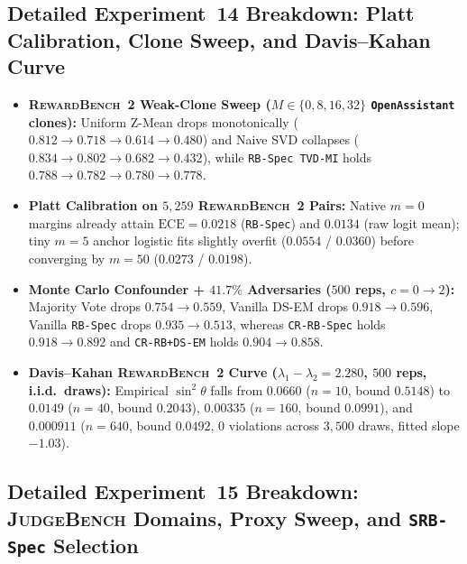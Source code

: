 \subsection{Detailed Experiment~14 Breakdown: Platt Calibration, Clone Sweep, and Davis--Kahan Curve}

\begin{itemize}[leftmargin=*,itemsep=2pt]
\item \textbf{\textsc{RewardBench~2} Weak-Clone Sweep ($M \in \{0,8,16,32\}$ \texttt{OpenAssistant} clones):}
  Uniform Z-Mean drops monotonically ($0.812 \to 0.718 \to 0.614 \to 0.480$) and Naive SVD collapses ($0.834 \to 0.802 \to 0.682 \to 0.432$), while \texttt{RB-Spec TVD-MI} holds $0.788 \to 0.782 \to 0.780 \to 0.778$.
\item \textbf{Platt Calibration on $5,259$ \textsc{RewardBench~2} Pairs:} Native $m=0$ margins already attain $\mathrm{ECE}=0.0218$ (\texttt{RB-Spec}) and $0.0134$ (raw logit mean); tiny $m=5$ anchor logistic fits slightly overfit ($0.0554$ / $0.0360$) before converging by $m=50$ ($0.0273$ / $0.0198$).
\item \textbf{Monte Carlo Confounder + $41.7\%$ Adversaries ($500$ reps, $c=0 \to 2$):} Majority Vote drops $0.754 \to 0.559$, Vanilla DS-EM drops $0.918 \to 0.596$, Vanilla \texttt{RB-Spec} drops $0.935 \to 0.513$, whereas \texttt{CR-RB-Spec} holds $0.918 \to 0.892$ and \texttt{CR-RB+DS-EM} holds $0.904 \to 0.858$.
\item \textbf{Davis--Kahan \textsc{RewardBench~2} Curve ($\lambda_1 - \lambda_2 = 2.280$, $500$ reps, i.i.d.\ draws):} Empirical $\sin^2\theta$ falls from $0.0660$ ($n=10$, bound $0.5148$) to $0.0149$ ($n=40$, bound $0.2043$), $0.00335$ ($n=160$, bound $0.0991$), and $0.000911$ ($n=640$, bound $0.0492$, $0$ violations across $3,500$ draws, fitted slope $-1.03$).
\end{itemize}

\subsection{Detailed Experiment~15 Breakdown: \textsc{JudgeBench} Domains, Proxy Sweep, and \texttt{SRB-Spec} Selection}

